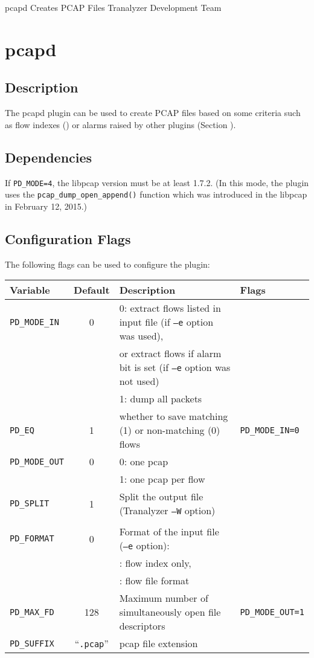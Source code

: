 \documentclass[documentation]{subfiles}
\begin{document}
\trantitle
    {pcapd}
    {Creates PCAP Files}
    {Tranalyzer Development Team}

\section{pcapd}\label{s:pcapd}

\subsection{Description}
The pcapd plugin can be used to create PCAP files based on some criteria such as flow indexes () or alarms raised by other plugins (Section ).

\subsection{Dependencies}
If {\tt PD\_MODE=4}, the libpcap version must be at least 1.7.2. (In this mode, the plugin uses the {\tt pcap\_dump\_open\_append()} function which was introduced in the libpcap in February 12, 2015.)

\subsection{Configuration Flags}

The following flags can be used to configure the plugin:
\begin{longtable}{lcll}
    \toprule
    {\bf Variable} & {\bf Default} & {\bf Description} & {\bf Flags}\\
    \midrule\endhead%
    {\tt PD\_MODE\_IN}  & 0 & 0: extract flows listed in input file (if {\tt --e} option was used),\\
                        &   & \qquad or extract flows if alarm bit is set (if {\tt --e} option was not used)\\
                        &   & 1: dump all packets\\
    {\tt PD\_EQ}        & 1 & whether to save matching (1) or non-matching (0) flows & {\tt PD\_MODE\_IN=0}\\
    {\tt PD\_MODE\_OUT} & 0 & 0: one pcap\\
                        &   & 1: one pcap per flow\\
    {\tt PD\_SPLIT}     & 1 & Split the output file (Tranalyzer {\tt --W} option)\\\\
    {\tt PD\_FORMAT}    & 0 & Format of the input file ({\tt --e} option):\\
                        &   & \qquad 0: flow index only,\\
                        &   & \qquad 1: flow file format\\
    {\tt PD\_MAX\_FD} & 128 & Maximum number of simultaneously open file descriptors & {\tt PD\_MODE\_OUT=1}\\
    {\tt PD\_SUFFIX} & ``{\tt .pcap}'' & pcap file extension\\
    \bottomrule
\end{longtable}
\end{document}
